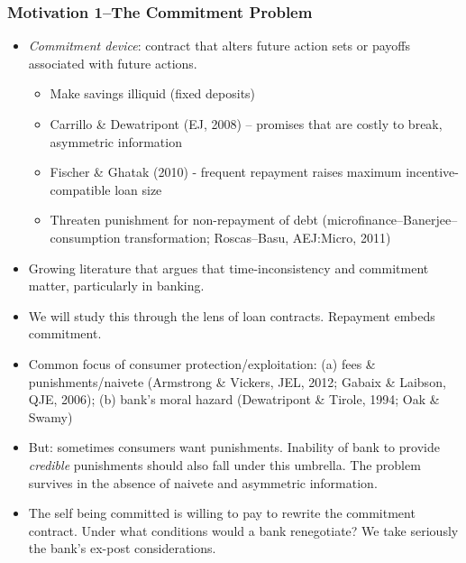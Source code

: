 \documentclass[11pt]{article}%
\begin{document}
\bigskip%

\frametitle{Motivation 1--The Commitment Problem}%


\begin{itemize}
\item \textit{Commitment device}: contract that alters future action sets or
payoffs associated with future actions.

\begin{itemize}
\item Make savings illiquid (fixed deposits)

\item Carrillo \& Dewatripont (EJ, 2008) -- promises that are costly to break,
asymmetric information

\item Fischer \& Ghatak (2010) - frequent repayment raises maximum
incentive-compatible loan size

\item Threaten punishment for non-repayment of debt
(microfinance--Banerjee--consumption transformation; Roscas--Basu, AEJ:Micro, 2011)
\end{itemize}

\item Growing literature that argues that time-inconsistency and commitment
matter, particularly in banking.

\item We will study this through the lens of loan contracts. Repayment embeds commitment.

\item Common focus of consumer protection/exploitation: (a) fees \&
punishments/naivete (Armstrong \& Vickers, JEL, 2012; Gabaix \& Laibson, QJE,
2006); (b) bank's moral hazard (Dewatripont \& Tirole, 1994; Oak \& Swamy)

\item But: sometimes consumers want punishments. Inability of bank to provide
\textit{credible} punishments should also fall under this umbrella. The
problem survives in the absence of naivete and asymmetric information.

\item The self being committed is willing to pay to rewrite the commitment
contract. Under what conditions would a bank renegotiate? We take seriously
the bank's ex-post considerations.
\end{itemize}

\bigskip%
\end{document}
